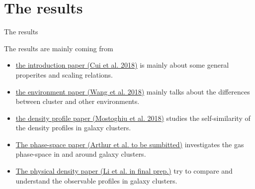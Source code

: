 \documentclass[aspectratio=1610]{beamer}
\begin{document}
\section{The results}
\begin{frame}
  \begin{center}
    {\Huge The results} \\
    \bigskip
  \end{center}
  
  The results are mainly coming from
  \begin{itemize}
      \item \hyperref{intropaper}{}{}{the introduction paper (Cui et al. 2018)} is mainly about some general properites and scaling relations.
      \item \hyperref{Wang}{}{}{the environment paper (Wang et al. 2018)}  mainly talks about the differences between cluster and other environments.
      \item \hyperref{Mostoghiu}{}{}{the density profile paper (Mostoghiu et al. 2018)} studies the self-similarity of the density profiles in galaxy clusters.
      \item \hyperref{Arthur}{}{}{The phase-space paper (Arthur et al. to be sumbitted)} investigates the gas phase-space in and around galaxy clusters.
      \item \hyperref{Li}{}{}{The physical density paper (Li et al. in final prep.)} try to compare and understand the observable profiles in galaxy clusters.
  \end{itemize}
   

\end{frame}
\end{document}
